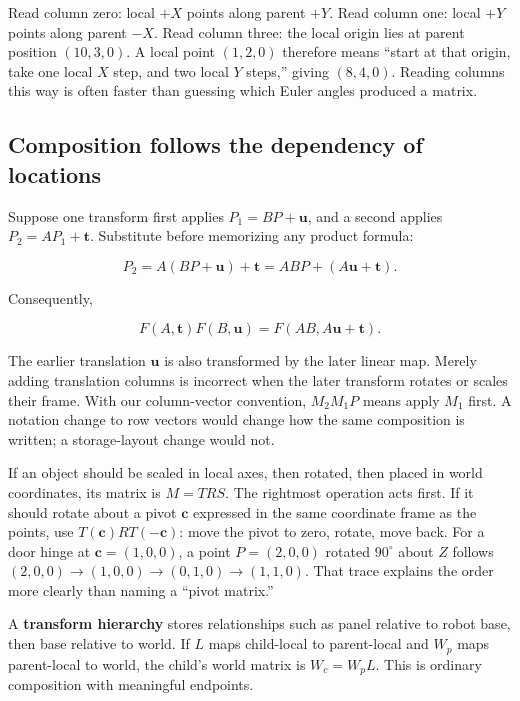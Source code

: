Read column zero: local \(+X\) points along parent \(+Y\). Read column one: local \(+Y\) points along parent \(-X\). Read column three: the local origin lies at parent position \((10,3,0)\). A local point \((1,2,0)\) therefore means ``start at that origin, take one local \(X\) step, and two local \(Y\) steps,'' giving \((8,4,0)\). Reading columns this way is often faster than guessing which Euler angles produced a matrix.

\subsection{Composition follows the dependency of locations}\label{01-foundations-i-ch018-composition-follows-the-dependency-of-locations}

Suppose one transform first applies \(P_1=BP+\mathbf u\), and a second applies \(P_2=AP_1+\mathbf t\). Substitute before memorizing any product formula:

\[
P_2=A(BP+\mathbf u)+\mathbf t
=ABP+(A\mathbf u+\mathbf t).
\]

Consequently,

\[
F(A,\mathbf t)F(B,\mathbf u)
=F(AB,A\mathbf u+\mathbf t).
\]

The earlier translation \(\mathbf u\) is also transformed by the later linear map. Merely adding translation columns is incorrect when the later transform rotates or scales their frame. With our column-vector convention, \(M_2M_1P\) means apply \(M_1\) first. A notation change to row vectors would change how the same composition is written; a storage-layout change would not.

If an object should be scaled in local axes, then rotated, then placed in world coordinates, its matrix is \(M=TRS\). The rightmost operation acts first. If it should rotate about a pivot \(\mathbf c\) expressed in the same coordinate frame as the points, use \(T(\mathbf c)RT(-\mathbf c)\): move the pivot to zero, rotate, move back. For a door hinge at \(\mathbf c=(1,0,0)\), a point \(P=(2,0,0)\) rotated \(90^\circ\) about \(Z\) follows \((2,0,0)\to(1,0,0)\to(0,1,0)\to(1,1,0)\). That trace explains the order more clearly than naming a ``pivot matrix.''

A \textbf{transform hierarchy} stores relationships such as panel relative to robot base, then base relative to world. If \(L\) maps child-local to parent-local and \(W_p\) maps parent-local to world, the child's world matrix is \(W_c=W_pL\). This is ordinary composition with meaningful endpoints.

